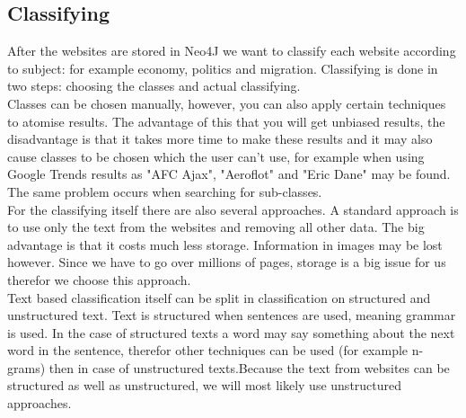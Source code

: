 \subsection{Classifying}
After the websites are stored in Neo4J we want to classify each website according to subject: for example economy, politics and migration. Classifying is done in two steps: choosing the classes and actual classifying. \\
Classes can be chosen manually, however, you can also apply certain techniques to atomise results. The advantage of this that you will get unbiased results, the disadvantage is that it takes more time to make these results and it may also cause classes to be chosen which the user can't use, for example when using Google Trends  \cite{googleTrends}  results as "AFC Ajax", "Aeroflot" and "Eric Dane" may be found. The same problem occurs when searching for sub-classes. \\
For the classifying itself there are also several approaches. A standard approach is to use only the text from the websites and removing all other data. The big advantage is that it costs much less storage. Information in images may be lost however. Since we have to go over millions of pages, storage is a big issue for us therefor we choose this approach. \\
Text based classification itself can be split in classification on structured and unstructured text. Text is structured when sentences are used, meaning grammar is used. In the case of structured texts a word may say something about the next word in the sentence, therefor other techniques can be used (for example n-grams) then in case of unstructured texts.Because the text from websites can be structured as well as unstructured, we will most likely use unstructured approaches.

